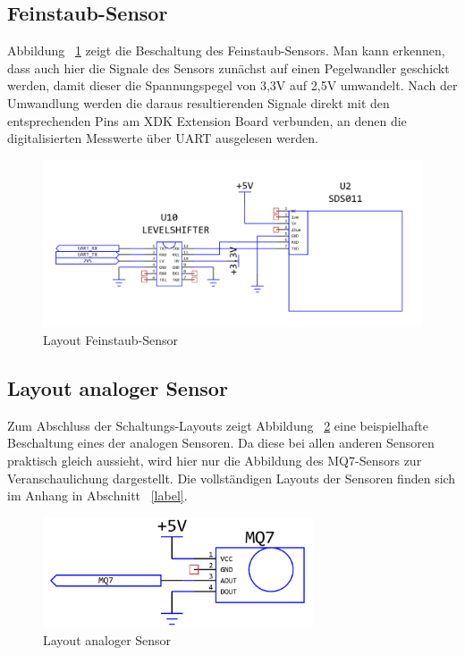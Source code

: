 \subsection{Feinstaub-Sensor}\label{subsec:Feinstaub-Sensor}
Abbildung ~\ref{fig:Layout_SDS011} zeigt die Beschaltung des Feinstaub-Sensors. Man kann erkennen, dass auch hier die Signale des Sensors zunächst auf einen Pegelwandler geschickt werden, damit dieser die Spannungspegel von 3,3V auf 2,5V umwandelt. Nach der Umwandlung werden die daraus resultierenden Signale direkt mit den entsprechenden Pins am \acs{XDK} Extension Board verbunden, an denen die digitalisierten Messwerte über \acs{UART} ausgelesen werden.
\begin{figure}[H]
	\includegraphics[width=\textwidth]{images/Layout_SDS011.png}	
	\caption{Layout Feinstaub-Sensor}
	\label{fig:Layout_SDS011}
\end{figure}
\subsection{Layout analoger Sensor}\label{subsec:Layout analoger Sensor}
Zum Abschluss der Schaltungs-Layouts zeigt Abbildung ~\ref{fig:Layout_Sensor_Example} eine beispielhafte Beschaltung eines der analogen Sensoren. Da diese bei allen anderen Sensoren praktisch gleich aussieht, wird hier nur die Abbildung des MQ7-Sensors zur Veranschaulichung dargestellt. Die vollständigen Layouts der Sensoren finden sich im Anhang in Abschnitt ~\ref{label}.
\begin{figure}[H]
	\includegraphics[width=8cm]{images/Layout_Sensor_Example.png}	
	\caption{Layout analoger Sensor}
	\label{fig:Layout_Sensor_Example}
\end{figure}